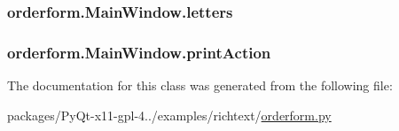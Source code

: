\subsubsection[{letters}]{\setlength{\rightskip}{0pt plus 5cm}orderform.\+Main\+Window.\+letters}\label{classorderform_1_1MainWindow_a1937632bf44dc054c43538c2f4bcac66}
\hypertarget{classorderform_1_1MainWindow_a97d6890c909440fbd62b36f2f6f3f52c}{}
\subsubsection[{print\+Action}]{\setlength{\rightskip}{0pt plus 5cm}orderform.\+Main\+Window.\+print\+Action}\label{classorderform_1_1MainWindow_a97d6890c909440fbd62b36f2f6f3f52c}


The documentation for this class was generated from the following file\+:\begin{DoxyCompactItemize}
\item 
packages/\+Py\+Qt-\/x11-\/gpl-\/4../examples/richtext/\hyperlink{orderform_8py}{orderform.\+py}\end{DoxyCompactItemize}
